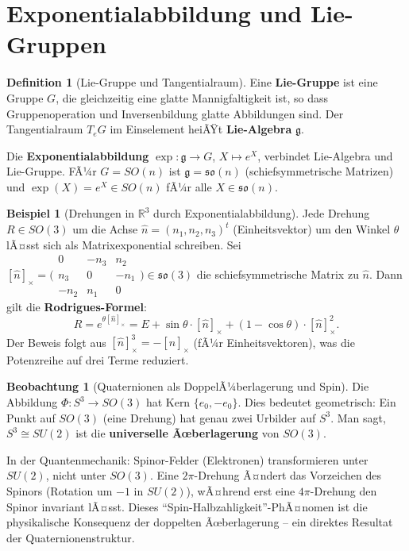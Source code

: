 ﻿\documentclass[a4paper,12pt]{report}
\theoremstyle{definition}
\newtheorem{definition}{Definition}
\newtheorem{beispiel}{Beispiel}
\newtheorem{beobachtung}{Beobachtung}
\begin{document}

\section{Exponentialabbildung und Lie-Gruppen}

\begin{definition}[Lie-Gruppe und Tangentialraum]
    Eine \textbf{Lie-Gruppe} ist eine Gruppe $G$, die gleichzeitig eine
    glatte Mannigfaltigkeit ist, so dass Gruppenoperation und Inversenbildung
    glatte Abbildungen sind. Der Tangentialraum $T_e G$ im Einselement
    heiÃŸt \textbf{Lie-Algebra} $\mathfrak{g}$.

    Die \textbf{Exponentialabbildung} $\exp : \mathfrak{g} \to G$,
    $X \mapsto e^X$, verbindet Lie-Algebra und Lie-Gruppe. FÃ¼r
    $G = SO(n)$ ist $\mathfrak{g} = \mathfrak{so}(n)$ (schiefsymmetrische
    Matrizen) und $\exp(X) = e^X \in SO(n)$ fÃ¼r alle $X \in \mathfrak{so}(n)$.
\end{definition}

\begin{beispiel}[Drehungen in $\mathbb{R}^3$ durch Exponentialabbildung]
    Jede Drehung $R \in SO(3)$ um die Achse $\hat{n} = (n_1, n_2, n_3)^t$
    (Einheitsvektor) um den Winkel $\theta$ lÃ¤sst sich als
    Matrixexponential schreiben. Sei
    $[\hat{n}]_\times = \bigl(\begin{smallmatrix}
    0 & -n_3 & n_2 \\ n_3 & 0 & -n_1 \\ -n_2 & n_1 & 0
    \end{smallmatrix}\bigr) \in \mathfrak{so}(3)$
    die schiefsymmetrische Matrix zu $\hat{n}$. Dann gilt die
    \textbf{Rodrigues-Formel}:
    \[
        R = e^{\theta [\hat{n}]_\times}
        = E + \sin\theta \cdot [\hat{n}]_\times
        + (1 - \cos\theta) \cdot [\hat{n}]_\times^2.
    \]
    Der Beweis folgt aus $[\hat{n}]_\times^3 = -[\hat{n}]_\times$
    (fÃ¼r Einheitsvektoren), was die Potenzreihe auf drei Terme reduziert.
\end{beispiel}

\begin{beobachtung}[Quaternionen als DoppelÃ¼berlagerung und Spin]
    Die Abbildung $\Phi : S^3 \to SO(3)$ hat Kern $\{e_0, -e_0\}$.
    Dies bedeutet geometrisch: Ein Punkt auf $SO(3)$ (eine Drehung)
    hat genau zwei Urbilder auf $S^3$. Man sagt, $S^3 \cong SU(2)$
    ist die \textbf{universelle Ãœberlagerung} von $SO(3)$.

    In der Quantenmechanik: Spinor-Felder (Elektronen) transformieren
    unter $SU(2)$, nicht unter $SO(3)$. Eine $2\pi$-Drehung Ã¤ndert
    das Vorzeichen des Spinors (Rotation um $-1$ in $SU(2)$), wÃ¤hrend
    erst eine $4\pi$-Drehung den Spinor invariant lÃ¤sst. Dieses
    ``Spin-Halbzahligkeit''-PhÃ¤nomen ist die physikalische Konsequenz
    der doppelten Ãœberlagerung -- ein direktes Resultat der
    Quaternionenstruktur.
\end{beobachtung}
\end{document}
